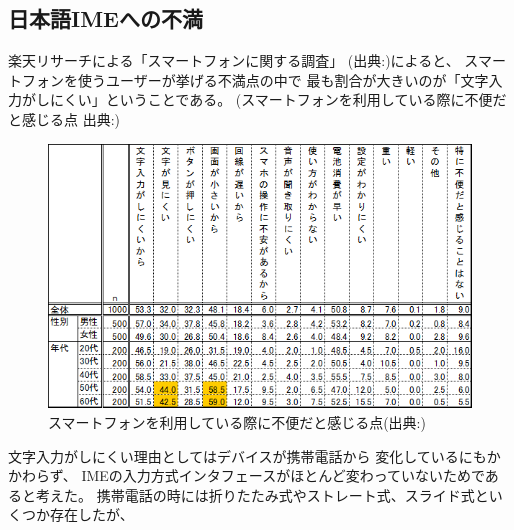 \subsection{日本語IMEへの不満}
楽天リサーチによる「スマートフォンに関する調査」
(出典:\cite{rakutensmartphone})によると、
スマートフォンを使うユーザーが挙げる不満点の中で
最も割合が大きいのが「文字入力がしにくい」ということである。
(スマートフォンを利用している際に不便だと感じる点 出典:\cite{rakutensmartphone})
\begin{figure}[htbp]
  \begin{center}
    \includegraphics[width=140mm,bb=0 0 589 368]{images/dissatisfaction.png}
    \caption{スマートフォンを利用している際に不便だと感じる点(出典:\cite{rakutensmartphone})}
    \label{fig:dissatisfaction}
  \end{center}
\end{figure}
文字入力がしにくい理由としてはデバイスが携帯電話から
変化しているにもかかわらず、
IMEの入力方式インタフェースがほとんど変わっていないためであると考えた。
携帯電話の時には折りたたみ式やストレート式、スライド式といくつか存在したが、
